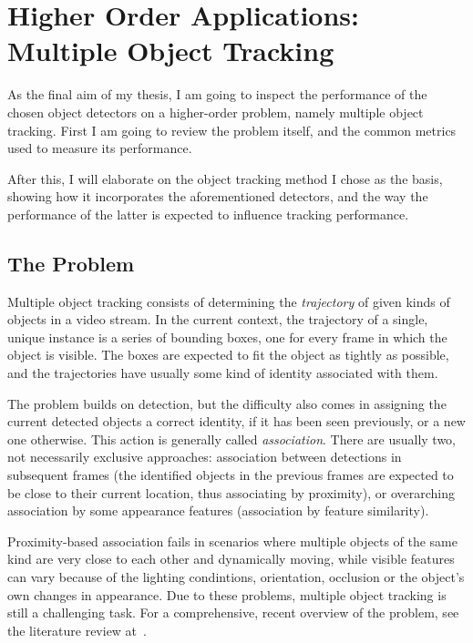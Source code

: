 \chapter{Higher Order Applications: Multiple Object Tracking}

As the final aim of my thesis, I am going to inspect the performance of the chosen object detectors on a higher-order problem, namely multiple object tracking. First I am going to review the problem itself, and the common metrics used to measure its performance. 

After this, I will elaborate on the object tracking method I chose as the basis, showing how it incorporates the aforementioned detectors, and the way the performance of the latter is expected to influence tracking performance.

\section{The Problem}

Multiple object tracking consists of determining the \textit{trajectory} of given kinds of objects in a video stream. In the current context, the trajectory of a single, unique instance is a series of bounding boxes, one for every frame in which the object is visible. The boxes are expected to fit the object as tightly as possible, and the trajectories have usually some kind of identity associated with them. 

The problem builds on detection, but the difficulty also comes in assigning the current detected objects a correct identity, if it has been seen previously, or a new one otherwise. This action is generally called \textit{association}. There are usually two, not necessarily exclusive approaches: association between detections in subsequent frames (the identified objects in the previous frames are expected to be close to their current location, thus associating by proximity), or overarching association by some appearance features (association by feature similarity).

Proximity-based association fails in scenarios where multiple objects of the same kind are very close to each other and dynamically moving, while visible features can vary because of the lighting condintions, orientation, occlusion or the object's own changes in appearance. Due to these problems, multiple object tracking is still a challenging task.
For a comprehensive, recent overview of the problem, see the literature review at~\cite{Luo_2021}.

